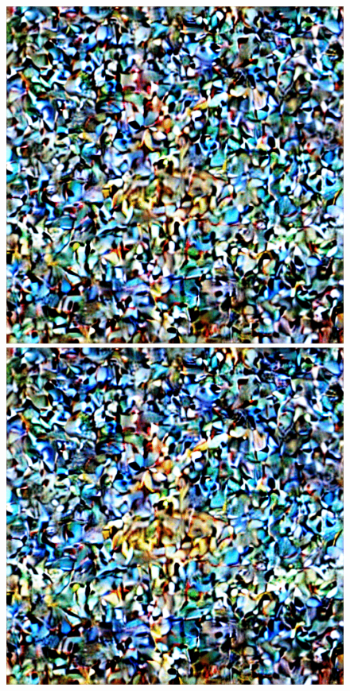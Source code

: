 \begin{figure}[h]
\begin{minipage}{0.10\textwidth}
    \end{minipage}
    \begin{minipage}{0.10\textwidth}
        \centering
        \includegraphics[width=\textwidth]{images/diffusion_models/noise_to_image_gif/2.png}
    \end{minipage}
    \begin{minipage}{0.10\textwidth}
        \centering
        \includegraphics[width=\textwidth]{images/diffusion_models/noise_to_image_gif/3.png}

\end{minipage}
\end{figure}
